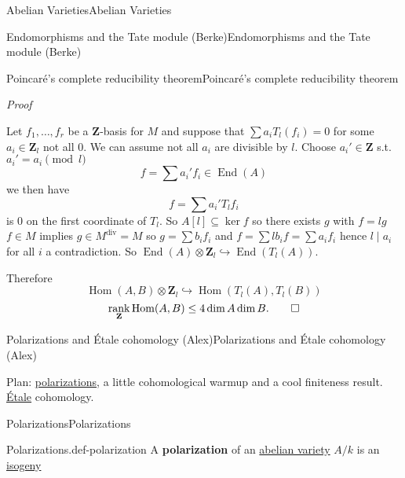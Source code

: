\documentclass[10pt,]{book}
\makeatletter
\newcommand{\terminology}[1]{\textbf{#1}}
\renewcommand*{\proofname}{Proof}
\renewenvironment{proof}[1][\proofname]{\par
  \pushQED{\qed}%
  \normalfont \topsep6\p@\@plus6\p@\relax
  \trivlist
  \item\relax
    {\itshape
    #1\@addpunct{.}}\hspace\labelsep\ignorespaces
}{%
  \popQED\endtrivlist\@endpefalse
}
\numberwithin{equation}{section}
\newcommand{\lb}{[}
\newcommand{\rb}{]}
\newcommand{\ZZ}{\mathbf{Z}}
\DeclareMathOperator{\End}{End}
\DeclareMathOperator{\Hom}{Hom}
\DeclareMathOperator{\rank}{rank}
\makeatother
\begin{document}
\begin{chapterptx}{Abelian Varieties}{}{Abelian Varieties}{}{}
\begin{sectionptx}{Endomorphisms and the Tate module (Berke)}{}{Endomorphisms and the Tate module (Berke)}{}{}
\begin{subsectionptx}{Poincaré's complete reducibility theorem}{}{Poincaré's complete reducibility theorem}{}{}
\begin{proof}
\hypertarget{p-241}{}%
Let \(f_1,\ldots, f_r\) be a \(\ZZ\)-basis for \(M\) and suppose that \(\sum a_iT_l(f_i)=0\) for some \(a_i \in \ZZ_l\) not all 0. We can assume not all \(a_i\) are divisible by \(l\). Choose \(a_i' \in \ZZ\) s.t. \(a_i'=a_i \pmod{l}\)%
\begin{equation*}
f = \sum a_i' f_i \in \End(A)
\end{equation*}
we then have%
\begin{equation*}
f = \sum a_i' T_lf_i
\end{equation*}
is 0 on the first coordinate of \(T_l\). So \(A\lb l \rb \subseteq \ker f\) so there exists \(g\) with \(f= lg\) \(f\in M\) implies \(g\in M^\text{div} = M\) so \(g = \sum b_i f_i\) and \(f = \sum lb_i f = \sum a_i f_i\) hence \(l\mid a_i\) for all \(i\) a contradiction. So \(\End(A)\otimes \ZZ_l \hookrightarrow \End(T_l(A))\).%
\par
\hypertarget{p-242}{}%
Therefore%
\begin{equation*}
\Hom(A,B) \otimes \ZZ_l \hookrightarrow \Hom(T_l(A), T_l(B))
\end{equation*}
%
\begin{equation*}
\rank_\ZZ \Hom(A,B) \le 4 \dim A\dim B\text{.}\qedhere
\end{equation*}
%
\end{proof}
\end{subsectionptx}
\end{sectionptx}
%
%
\typeout{************************************************}
\typeout{************************************************}
%
\begin{sectionptx}{Polarizations and Étale cohomology (Alex)}{}{Polarizations and Étale cohomology (Alex)}{}{}\label{sec-polarizations-etale}
\begin{introduction}{}%
\hypertarget{p-243}{}%
Plan: \hyperref[def-polarization]{polarizations}, a little cohomological warmup and a cool finiteness result. \hyperref[def-etale]{Étale} cohomology.%
\end{introduction}%
%
%
\typeout{************************************************}
\typeout{************************************************}
%
\begin{subsectionptx}{Polarizations}{}{Polarizations}{}{}\label{subsection-26}
\begin{definition}{Polarizations.}{def-polarization}%
\hypertarget{p-244}{}%
A \terminology{polarization} of an \hyperref[def-buntes-abvar]{abelian variety} \(A/k\) is an \hyperref[def-supersing-isog-isog]{isogeny}%

\end{definition}
\end{subsectionptx}
\end{sectionptx}
\end{chapterptx}
\end{document}
